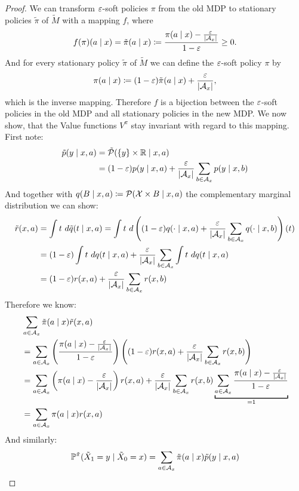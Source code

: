 \begin{proof}
	We can transform \(\varepsilon\)-soft policies \(\pi\) from the old MDP to stationary policies \(\tilde{\pi}\) of \(\tilde{M}\) with a mapping \(f\), where
	\[
		f(\pi)(a\mid x)=\tilde{\pi}(a\mid x)\coloneqq \frac{\pi(a\mid x)-\frac{\varepsilon}{|\mathcal{A}_x|}}{1-\varepsilon}\ge 0.
	\]
	And for every stationary policy \(\tilde{\pi}\) of \(\tilde{M}\) we can define the \(\varepsilon\)-soft policy \(\pi\) by
	\[
		\pi(a\mid x)\coloneqq (1-\varepsilon)\tilde{\pi}(a\mid x) + \frac{\varepsilon}{|\mathcal{A}_x|},
	\]
	which is the inverse mapping. Therefore \(f\) is a bijection between the \(\varepsilon\)-soft policies in the old MDP and all stationary policies in the new MDP. We now show, that the Value functions \(V^\pi\) stay invariant with regard to this mapping. 
	First note:
	\begin{align*}
		\tilde{p}(y\mid x,a)
		&=\tilde{\mathcal{P}}(\{y\}\times \mathbb{R}\mid x,a)\\
		&=(1-\varepsilon)p(y\mid x,a)+\frac{\varepsilon}{|\mathcal{A}_x|}\sum_{b\in\mathcal{A}_x}p(y\mid x,b)
	\end{align*}
	And together with \(q(B\mid x,a)\coloneqq \mathcal{P}(\mathcal{X}\times B \mid x,a)\) the complementary marginal distribution we can show:
	\begin{align*}
		\tilde{r}(x,a)&=\int t\ d\tilde{q}(t \mid x,a)=\int t\ 
		d\left((1-\vep)q(\cdot\mid x,a) + \frac{\vep}{|\cA_x|}\sum_{b\in\cA_x}q(\cdot\mid x,b)\right)(t) \\
		&=(1-\vep)\int t\ dq(t\mid x,a) 
		+ \frac{\vep}{|\cA_x|}\sum_{b\in\cA_x} \int t\ dq(t\mid x,a)\\
		&=(1-\vep)r(x,a) + \frac{\vep}{|\cA_x|}\sum_{b\in\cA_x}r(x,b)
	\end{align*}
	Therefore we know:
	\begin{align*}
		&\sum_{a\in\cA_x}\tilde{\pi}(a\mid x)\tilde{r}(x,a)\\
		&=\sum_{a\in\cA_x} \left(\frac{\pi(a\mid x)-\frac{\vep}{|\cA_x|}}{1-\vep} \right)
		\left((1-\vep)r(x,a) + \frac{\vep}{|\cA_x|}\sum_{b\in\cA_x}r(x,b)\right)\\
		&=\sum_{a\in\cA_x}\left(\pi(a\mid x)-\frac{\vep}{|\cA_x|}\right)r(x,a) 
		+ \frac{\vep}{|\cA_x|}\sum_{b\in\cA_x}r(x,b) 
		\underbracket[1pt]{\sum_{a\in\cA_x}\frac{\pi(a\mid x)-\frac{\vep}{|\cA_x|}}{1-\vep}}_{
			=1
		}\\
		&=\sum_{a\in\cA_x}\pi(a\mid x)r(x,a)
	\end{align*}
	And similarly:
	\begin{align*}
		&\Pr^{\tilde{\pi}}(\tilde{X}_1=y\mid \tilde{X}_0=x) 
		=\sum_{a\in\cA_x}\tilde{\pi}(a\mid x)\tilde{p}(y\mid x,a)\\

\end{align*}
\end{proof}
